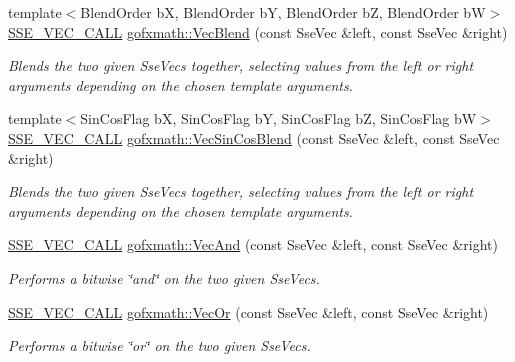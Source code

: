 \begin{DoxyCompactItemize}
{\footnotesize template$<$Blend\+Order b\+X, Blend\+Order b\+Y, Blend\+Order b\+Z, Blend\+Order b\+W$>$ }\\\hyperlink{ssevec__math__defs_8h_a97454f977a5281455cecacce1e8ba670}{S\+S\+E\+\_\+\+V\+E\+C\+\_\+\+C\+A\+L\+L} \hyperlink{group___s_i_m_d_vec_math_ga48b58f474383827ced71edfdf5bb0f8c}{gofxmath\+::\+Vec\+Blend} (const Sse\+Vec \&left, const Sse\+Vec \&right)
\begin{DoxyCompactList}\small\item\em Blends the two given Sse\+Vecs together, selecting values from the left or right arguments depending on the chosen template arguments. \end{DoxyCompactList}\item 
{\footnotesize template$<$Sin\+Cos\+Flag b\+X, Sin\+Cos\+Flag b\+Y, Sin\+Cos\+Flag b\+Z, Sin\+Cos\+Flag b\+W$>$ }\\\hyperlink{ssevec__math__defs_8h_a97454f977a5281455cecacce1e8ba670}{S\+S\+E\+\_\+\+V\+E\+C\+\_\+\+C\+A\+L\+L} \hyperlink{group___s_i_m_d_vec_math_ga7b0224a324592a5fc96f9558bd8d4697}{gofxmath\+::\+Vec\+Sin\+Cos\+Blend} (const Sse\+Vec \&left, const Sse\+Vec \&right)
\begin{DoxyCompactList}\small\item\em Blends the two given Sse\+Vecs together, selecting values from the left or right arguments depending on the chosen template arguments. \end{DoxyCompactList}\item 
\hyperlink{ssevec__math__defs_8h_a97454f977a5281455cecacce1e8ba670}{S\+S\+E\+\_\+\+V\+E\+C\+\_\+\+C\+A\+L\+L} \hyperlink{group___s_i_m_d_vec_math_ga79078e17e228025b5a974f11aa5fbb74}{gofxmath\+::\+Vec\+And} (const Sse\+Vec \&left, const Sse\+Vec \&right)
\begin{DoxyCompactList}\small\item\em Performs a bitwise \char`\"{}and\char`\"{} on the two given Sse\+Vecs. \end{DoxyCompactList}\item 
\hyperlink{ssevec__math__defs_8h_a97454f977a5281455cecacce1e8ba670}{S\+S\+E\+\_\+\+V\+E\+C\+\_\+\+C\+A\+L\+L} \hyperlink{group___s_i_m_d_vec_math_gad38069a17733d63e5a17bbe45d792ea5}{gofxmath\+::\+Vec\+Or} (const Sse\+Vec \&left, const Sse\+Vec \&right)
\begin{DoxyCompactList}\small\item\em Performs a bitwise \char`\"{}or\char`\"{} on the two given Sse\+Vecs. \end{DoxyCompactList}\item 

\end{DoxyCompactItemize}
